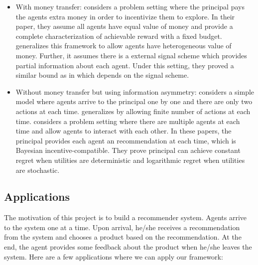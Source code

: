 \documentclass{article}
\begin{document}
\begin{itemize}
\item With money transfer: \cite{frazier2014incentivizing} considers a problem setting where the principal pays the agents extra money in order to incentivize them to explore. In their paper, they assume all agents have equal value of money and provide a complete characterization of achievable reward with a fixed budget. \cite{han2015incentivizing} generalizes this framework to allow agents have heterogeneous value of money. Further, it assumes there is a external signal scheme which provides partial information about each agent. Under this setting, they proved a similar bound as in \cite{frazier2014incentivizing} which depends on the signal scheme.
\item Without money transfer but using information asymmetry: \cite{kremer2014implementing} considers a simple model where agents arrive to the principal one by one and there are only two actions at each time. \cite{mansour2015bayesian} generalizes \cite{kremer2014implementing} by allowing finite number of actions at each time. \cite{mansour2016bayesian} considers a problem setting where there are multiple agents at each time and allow agents to interact with each other. In these papers, the principal provides each agent an recommendation at each time, which is Bayesian incentive-compatible. They prove principal can achieve constant regret when utilities are deterministic and logarithmic regret when utilities are stochastic.
\end{itemize}

\subsection{Applications}

The motivation of this project is to build a recommender system. Agents arrive to the system one at a time. Upon arrival, he/she receives a recommendation from the system and chooses a product based on the recommendation. At the end, the agent provides some feedback about the product when he/she leaves the system. Here are a few applications where we can apply our framework:
\end{document}
